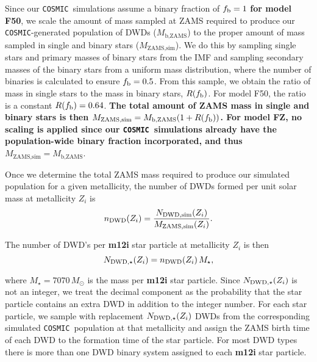 \documentclass[twocolumn, linenumbers]{aastex631}
\newcommand{\cosmic}{\texttt{COSMIC}}
\begin{document}
Since our \cosmic\ simulations assume a binary fraction of $f_{\rm{b}} = 1$ \textbf{for model F50}, we scale the amount of mass sampled at ZAMS required to produce our \cosmic-generated population of DWDs ($M_{\text{b,ZAMS}}$) to the proper amount of mass sampled in single and binary stars ($M_{\text{ZAMS,sim}}$). We do this by sampling single stars and primary masses of binary stars from the \cite{Kroupa2001} IMF and sampling secondary masses of the binary stars from a uniform mass distribution, where the number of binaries is calculated to ensure $f_{\rm{b}}=0.5$. From this sample, we obtain the ratio of mass in single stars to the mass in binary stars, $R(f_{\rm{b}})$. For model F50, the ratio is a constant $R(f_{\rm{b}}) = 0.64$. \textbf{The total amount of ZAMS mass in single and binary stars is then $M_{\text{ZAMS,sim}} =  M_{\text{b,ZAMS}} (1 + R(f_{\rm{b}}))$. For model FZ, no scaling is applied since our \cosmic\ simulations already have the population-wide binary fraction incorporated, and thus $M_{\text{ZAMS,sim}} =  M_{\text{b,ZAMS}}$}. 


Once we determine the total ZAMS mass required to produce our simulated population for a given metallicity, the number of DWDs formed per unit solar mass at metallicity $Z_i$ is
\begin{equation}
    n_{\rm{DWD}}(Z_i) = \frac{N_{\rm{DWD, sim}}(Z_i)}{M_{\rm{ZAMS, sim}}(Z_i)}.
\end{equation}

\noindent The number of DWD’s per \textbf{m12i} star particle at metallicity $Z_i$ is then
\begin{equation}
    N_{\rm{DWD},\star} (Z_i) = n_{\rm{DWD}}(Z_i)\, M_\star,
\end{equation}


\noindent where $M_\star = 7070\,M_\odot$ is the mass per \textbf{m12i} star particle. Since $N_{\rm{DWD},\star} (Z_i)$ is not an integer, we treat the decimal component as the probability that the star particle contains an extra DWD in addition to the integer number. For each star particle, we sample with replacement $N_{\rm{DWD},\star}(Z_i)$ DWDs from the corresponding simulated \cosmic\ population at that metallicity and assign the ZAMS birth time of each DWD to the formation time of the star particle. For most DWD types there is more than one DWD binary system assigned to each \textbf{m12i} star particle. 
\end{document}
